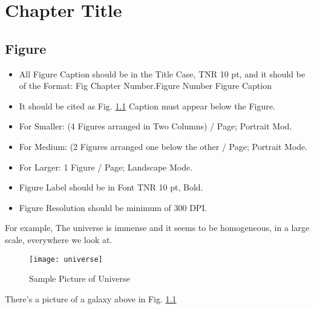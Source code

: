 \chapter{Chapter Title} \label{c6}
\section{Figure}
\begin{itemize}
	\item All Figure Caption should be in the Title Case, TNR 10 pt, and it should be of the Format: Fig Chapter Number.Figure Number Figure Caption
	
	\item It should be cited as Fig. \ref{c6:fig1} 
	Caption must appear below the Figure.

	
	\item For Smaller: (4 Figures arranged in Two Columns) / Page; Portrait Mod.
	
	\item For Medium: (2 Figures arranged one below the other / Page; Portrait Mode.
	
	\item For Larger: 1 Figure / Page; Landscape Mode.
	
	\item Figure Label should be in Font TNR 10 pt, Bold.
	
	\item Figure Resolution should be minimum of 300 DPI.
\end{itemize}

For example, The universe is immense and it seems to be homogeneous, 
in a large scale, everywhere we look at.

	\begin{figure}[htb]
		\begin{center}
		\texttt{[image: universe]}
	
		\caption{Sample Picture of Universe }
		\label{c6:fig1}
	\end{center}
	\end{figure}

There's a picture of a galaxy above in Fig. \ref{c6:fig1}

